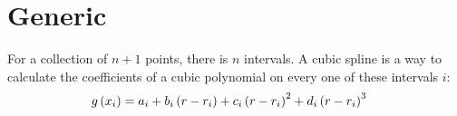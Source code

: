 \documentclass[12pt,letterpaper]{article}
\title{\mytitle}
\date{}
\author{Nicolas Bigaouette}
\begin{document}
\maketitle

\tableofcontents

\section{Generic}
For a collection of $n+1$ points, there is $n$ intervals. A cubic spline is a way to calculate
the coefficients of a cubic polynomial on every one of these intervals $i$:
\begin{align}
g\left( x_i \right) & = a_{i} + b_{i} \left( r - r_{i} \right) + c_{i} \left( r - r_{i} \right)^2 + d_{i} \left( r - r_{i} \right)^3
\end{align}
\end{document}
